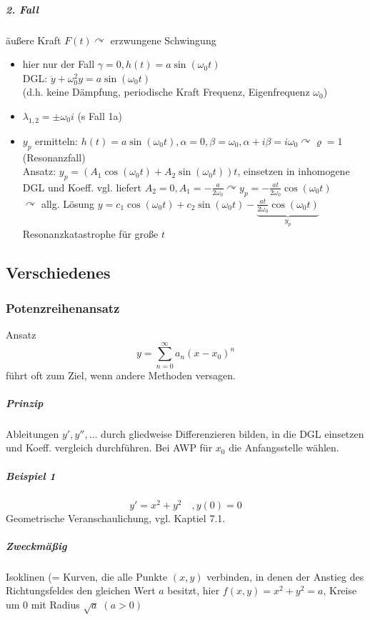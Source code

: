 \documentclass[a4paper]{scrartcl}
\begin{document}
\subparagraph{2. Fall} äußere Kraft $F(t) \curvearrowright$ erzwungene Schwingung
\begin{itemize}
\item hier nur der Fall $\gamma = 0, h(t) = a \sin{(\omega_0 t)}$\\
DGL: $\ddot{y} + \omega_0^2 y = a \sin{(\omega_0 t)}$\\
(d.h. keine Dämpfung, periodische Kraft Frequenz, Eigenfrequenz $\omega_0$)\\
\item $\lambda_{1,2} = \pm \omega_0 i$ (s Fall 1a)
\item $y_p$ ermitteln: $h(t) = a \sin{(\omega_0 t)}, \alpha = 0, \beta = \omega_0, \alpha + i \beta = i \omega_0 \curvearrowright \varrho = 1$ (Resonanzfall)\\
Ansatz: $y_p = (A_1 \cos{(\omega_0 t)} + A_2 \sin{(\omega_0 t)} ) t$, einsetzen in inhomogene DGL und Koeff. vgl. liefert $A_2 = 0,A_1 = - \frac{a}{2\omega_0} \curvearrowright y_p = - \frac{a t}{2 \omega_0} \cos{(\omega_0 t)}$\\
$\curvearrowright$ allg. Lösung $y= c_1 \cos{(\omega_0 t)} + c_2 \sin{(\omega_0 t)} - \underbrace{\frac{a t}{2 \omega_0} \cos{(\omega_0 t)}}_{y_p}$\\
Resonanzkatastrophe für große $t$
\end{itemize}

\subsection{Verschiedenes}%
\subsubsection{Potenzreihenansatz}
Ansatz \[ y= \sum\limits_{n=0}^{\infty} a_n(x-x_0)^n\] führt oft zum Ziel, wenn andere Methoden versagen.

\subparagraph{Prinzip} Ableitungen $y',y'',\dots$ durch gliedweise Differenzieren bilden, in die DGL einsetzen und Koeff. vergleich durchführen. Bei AWP für $x_0$ die Anfangsstelle wählen.
\subparagraph{Beispiel 1} \[ y' = x^2 + y^2 \quad , y(0) = 0\]
Geometrische Veranschaulichung, vgl. Kaptiel 7.1.

\subparagraph{Zweckmäßig} Isoklinen (= Kurven, die alle Punkte $(x,y)$ verbinden, in denen der Anstieg des Richtungsfeldes den gleichen Wert $a$ besitzt, hier $f(x,y) = x^2 + y^2 = a$, Kreise um $0$ mit Radius $\sqrt{a}\; ( a>0)$
\end{document}
